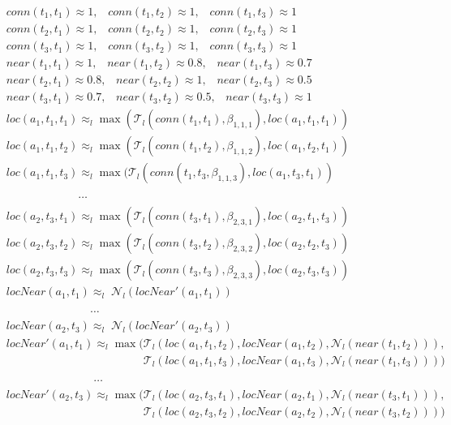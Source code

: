 \documentclass{tlp}
\newcommand{\fneg}[2]{\ensuremath{\mathcal{N}_{#1}(#2)}}
\newcommand{\lneg}[1]{\fneg{l}{#1}}
\newcommand{\feq}{\ensuremath{\approx}}
\newcommand{\pretnorm}{\mathcal{T}}
\begin{document}
{\allowdisplaybreaks \begin{align*}
&conn(t_1,t_1) \feq 1,\;\;\;conn(t_1,t_2) \feq 1,\;\;\;conn(t_1,t_3) \feq 1\\
&conn(t_2,t_1) \feq 1,\;\;\;conn(t_2,t_2) \feq 1,\;\;\;conn(t_2,t_3) \feq 1\\
&conn(t_3,t_1) \feq 1,\;\;\;conn(t_3,t_2) \feq 1,\;\;\;conn(t_3,t_3) \feq 1\\
&near(t_1,t_1) \feq 1,\;\;\;near(t_1,t_2) \feq 0.8,\;\;\;near(t_1,t_3) \feq 0.7\\
   &near(t_2,t_1) \feq 0.8,\;\;\;near(t_2,t_2) \feq 1,\;\;\;near(t_2,t_3) \feq 0.5\\
   &near(t_3,t_1) \feq 0.7,\;\;\;near(t_3,t_2) \feq 0.5,\;\;\;near(t_3,t_3) \feq 1\\
   &loc(a_1,t_1,t_1) \feq_l \max(\pretnorm_l(conn(t_1,t_1),\beta_{1,1,1}),loc(a_1,t_1,t_1))\\
   &loc(a_1,t_1,t_2) \feq_l \max(\pretnorm_l(conn(t_1,t_2),\beta_{1,1,2}),loc(a_1,t_2,t_1))\\
   &loc(a_1,t_1,t_3) \feq_l \max(\pretnorm_l(conn(t_1,t_3,\beta_{1,1,3}),loc(a_1,t_3,t_1))\\
   &\phantom{loc(a_1,t_1,t_3) }\ldots\\
   &loc(a_2,t_3,t_1) \feq_l \max(\pretnorm_l(conn(t_3,t_1),\beta_{2,3,1}),loc(a_2,t_1,t_3))\\
   &loc(a_2,t_3,t_2) \feq_l \max(\pretnorm_l(conn(t_3,t_2),\beta_{2,3,2}),loc(a_2,t_2,t_3))\\
   &loc(a_2,t_3,t_3) \feq_l \max(\pretnorm_l(conn(t_3,t_3),\beta_{2,3,3}),loc(a_2,t_3,t_3))\\
   &locNear(a_1,t_1) \feq_l\; \lneg{locNear'(a_1,t_1)}\\
   &\phantom{locNear(a_1,t_1) }\ldots\\
   &locNear(a_2,t_3) \feq_l \;\lneg{locNear'(a_2,t_3)}\\
   &locNear'(a_1,t_1) \feq_l \max(\pretnorm_l(loc(a_1,t_1,t_2),locNear(a_1,t_2),\lneg{near(t_1,t_2)}),\\
   &\phantom{locNear'(a_1,t_1) \feq_l \max(}\pretnorm_l(loc(a_1,t_1,t_3),locNear(a_1,t_3),\lneg{near(t_1,t_3)}))\\
&\phantom{locNear'(a_1,t_1) }\ldots\\
   & locNear'(a_2,t_3) \feq_l \max(\pretnorm_l(loc(a_2,t_3,t_1),locNear(a_2,t_1),\lneg{near(t_3,t_1)}),\\
   &\phantom{locNear'(a_2,t_3) \feq_l \max(}\pretnorm_l(loc(a_2,t_3,t_2),locNear(a_2,t_2),\lneg{near(t_3,t_2)}))\\

\end{align*}}
\end{document}
